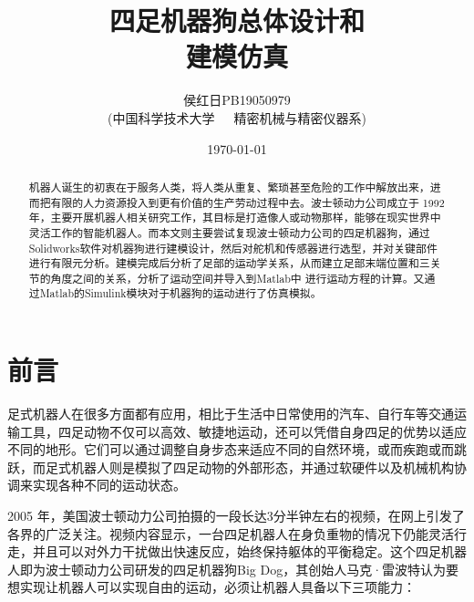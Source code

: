 \documentclass[10pt]{article}
\begin{document}
\title{\fontsize{36pt}{36pt}\selectfont%
	{\songti%
        四足机器狗总体设计和\protect\\
		建模仿真}}

\author{\fontsize{12pt}{18pt}\selectfont%
	{\fangsong%
		侯红日PB19050979}\\
	\fontsize{10.5pt}{15.75pt}\selectfont%
	{\fangsong%
		(中国科学技术大学~~~精密机械与精密仪器系)}}%
\date{\today}

\maketitle


\begin{abstract}
	机器人诞生的初衷在于服务人类，将人类从重复、繁琐甚至危险的工作中解放出来，进而把有限的人力资源投入到更有价值的生产劳动过程中去。波士顿动力公司成立于 1992 年，主要开展机器人相关研究工作，其目标是打造像人或动物那样，能够在现实世界中灵活工作的智能机器人。而本文则主要尝试复现波士顿动力公司的四足机器狗，通过Solidworks软件对机器狗进行建模设计，然后对舵机和传感器进行选型，并对关键部件进行有限元分析。建模完成后分析了足部的运动学关系，从而建立足部末端位置和三关节的角度之间的关系，分析了运动空间并导入到Matlab中	进行运动方程的计算。又通过Matlab的Simulink模块对于机器狗的运动进行了仿真模拟。
\end{abstract}

\fontsize{10.5pt}{15.75pt}

\newpage
\tableofcontents
\newpage

\section{前言}
足式机器人在很多方面都有应用，相比于生活中日常使用的汽车、自行车等交通运输工具，四足动物不仅可以高效、敏捷地运动，还可以凭借自身四足的优势以适应不同的地形。它们可以通过调整自身步态来适应不同的自然环境，或而疾跑或而跳跃，而足式机器人则是模拟了四足动物的外部形态，并通过软硬件以及机械机构协调来实现各种不同的运动状态。

2005 年，美国波士顿动力公司拍摄的一段长达3分半钟左右的视频，在网上引发了各界的广泛关注。视频内容显示，一台四足机器人在身负重物的情况下仍能灵活行走，并且可以对外力干扰做出快速反应，始终保持躯体的平衡稳定。这个四足机器人即为波士顿动力公司研发的四足机器狗Big Dog，其创始人马克·雷波特认为要想实现让机器人可以实现自由的运动，必须让机器人具备以下三项能力：
\end{document}
